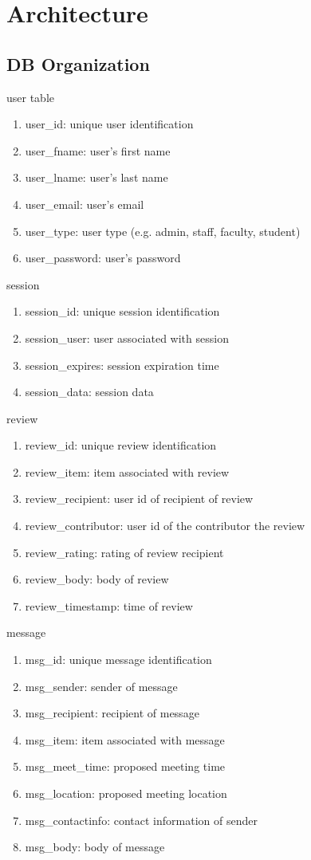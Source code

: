 \section{Architecture}

\subsection{DB Organization}

{\large user table}
\begin{enumerate}
\item user\_id: unique user identification
\item user\_fname: user's first name
\item user\_lname: user's last name
\item user\_email: user's email
\item user\_type: user type (e.g. admin, staff, faculty, student)
\item user\_password: user's password
\end{enumerate}%
%
{\large session}
\begin{enumerate}
\item session\_id: unique session identification
\item session\_user: user associated with session
\item session\_expires: session expiration time
\item session\_data: session data
\end{enumerate}%
%
{\large review}
\begin{enumerate}
\item review\_id: unique review identification
\item review\_item: item associated with review
\item review\_recipient: user id of recipient of review
\item review\_contributor: user id of the contributor the review
\item review\_rating: rating of review recipient
\item review\_body: body of review
\item review\_timestamp: time of review
\end{enumerate}%
%
{\large message}
\begin{enumerate}
\item msg\_id: unique message identification
\item msg\_sender: sender of message
\item msg\_recipient: recipient of message
\item msg\_item: item associated with message
\item msg\_meet\_time: proposed meeting time
\item msg\_location: proposed meeting location
\item msg\_contactinfo: contact information of sender
\item msg\_body: body of message
\end{enumerate}%
